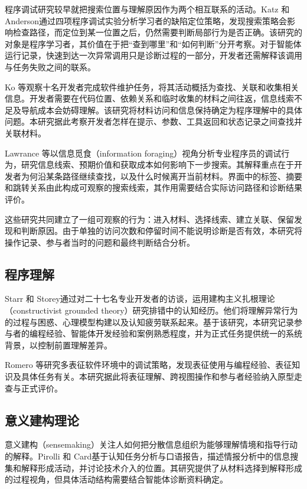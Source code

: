 程序调试研究较早就把搜索位置与理解原因作为两个相互联系的活动。Katz 和 Anderson\cite{ref15}通过四项程序调试实验分析学习者的缺陷定位策略，发现搜索策略会影响检查路径，而定位到某一位置之后，仍然需要判断局部行为是否正确。该研究的对象是程序学习者，其价值在于把“查到哪里”和“如何判断”分开考察。对于智能体运行记录，快速到达一次异常调用只是诊断过程的一部分，开发者还需解释该调用与任务失败之间的联系。

Ko 等\cite{ref14}观察十名开发者完成软件维护任务，将其活动概括为查找、关联和收集相关信息。开发者需要在代码位置、依赖关系和临时收集的材料之间往返，信息线索不足及导航成本会妨碍理解。该研究将材料访问和信息保持确定为程序理解中的具体问题。本研究据此考察开发者怎样在提示、参数、工具返回和状态记录之间查找并关联材料。

Lawrance 等\cite{ref08}以信息觅食（information foraging）视角分析专业程序员的调试行为，研究信息线索、预期价值和获取成本如何影响下一步搜索。其解释重点在于开发者为何沿某条路径继续查找，以及什么时候离开当前材料。界面中的标签、摘要和跳转关系由此构成可观察的搜索线索，其作用需要结合实际访问路径和诊断结果评价。

这些研究共同建立了一组可观察的行为：进入材料、选择线索、建立关联、保留发现和判断原因。由于单独的访问次数和停留时间不能说明诊断是否有效，本研究将操作记录、参与者当时的问题和最终判断结合分析。

\subsection{程序理解}

Starr 和 Storey\cite{ref16}通过对二十七名专业开发者的访谈，运用建构主义扎根理论（constructivist grounded theory）研究排错中的认知经历。他们将理解异常行为的过程与困惑、心理模型构建以及认知疲劳联系起来。基于该研究，本研究记录参与者的编程经验、智能体开发经验和案例熟悉程度，并为正式任务提供统一的系统背景，以控制前置理解差异。

Romero 等\cite{ref34}研究多表征软件环境中的调试策略，发现表征使用与编程经验、表征知识及具体任务有关。本研究据此将表征理解、跨视图操作和参与者经验纳入原型走查与正式评价。

\subsection{意义建构理论}

意义建构（sensemaking）关注人如何把分散信息组织为能够理解情境和指导行动的解释。Pirolli 和 Card\cite{ref17}基于认知任务分析与口语报告，描述情报分析中的信息搜集和解释形成活动，并讨论技术介入的位置。其研究提供了从材料选择到解释形成的过程视角，但具体活动结构需要结合智能体诊断资料确定。

